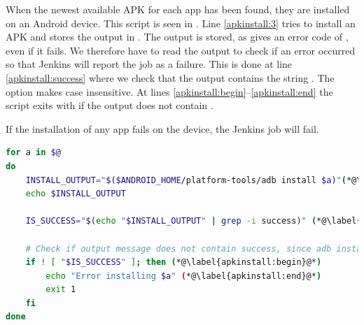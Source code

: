 When the newest available APK for each app has been found, they are installed on an Android device. This script is seen in . Line \ref{apkinstall:3} tries to install an APK and stores the output in . The output is stored, as  gives an error code of , even if it fails. We therefore have to read the output to check if an error occurred so that Jenkins will report the job as a failure. This is done at line \ref{apkinstall:success} where we check that the output contains the string . The  option makes  case insensitive. At lines \ref{apkinstall:begin}--\ref{apkinstall:end} the script exits with  if the output does not contain .

If the installation of any app fails on the device, the Jenkins job will fail.

\begin{lstlisting}[language=bash,showstringspaces=false,caption=Script that installs the given APKs to an Android device,label=lst:install_apks_on_android_device]
for a in $@
do
    INSTALL_OUTPUT="$($ANDROID_HOME/platform-tools/adb install $a)"(*@\label{apkinstall:3}@*)
    echo $INSTALL_OUTPUT

    IS_SUCCESS="$(echo "$INSTALL_OUTPUT" | grep -i success)" (*@\label{apkinstall:success}@*)

    # Check if output message does not contain success, since adb install does not provide exit code != 0 at failure
    if ! [ "$IS_SUCCESS" ]; then (*@\label{apkinstall:begin}@*)
        echo "Error installing $a" (*@\label{apkinstall:end}@*)
        exit 1
    fi
done
\end{lstlisting}